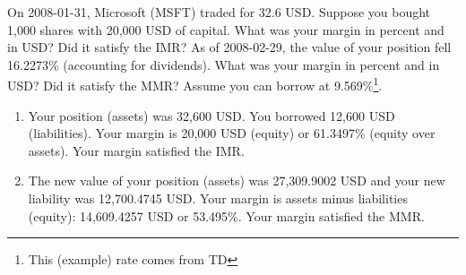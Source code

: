 \documentclass{beamer}
\begin{document}

\begin{frame}{}
	\small
	On 2008-01-31, Microsoft (MSFT) traded for 32.6 USD. Suppose you bought 1,000 shares with 20,000 USD of capital. What was your margin in percent and in USD? Did it satisfy the IMR? As of 2008-02-29, the value of your position fell 16.2273\% (accounting for dividends). What was your margin in percent and in USD? Did it satisfy the MMR? Assume you can borrow at 9.569\%\footnote{This (example) rate comes from TD}.  
	\pause
		\begin{enumerate}
			\item{\color{blue}Your position (assets) was 32,600 USD. You borrowed 12,600 USD (liabilities). Your margin is 20,000 USD (equity) or 61.3497\% (equity over assets). Your margin satisfied the IMR.}
			\item{\color{blue}The new value of your position (assets) was 27,309.9002 USD and your new liability was 12,700.4745 USD. Your margin is assets minus liabilities (equity): 14,609.4257 USD or 53.495\%. Your margin satisfied the MMR.}
		\end{enumerate}
\end{frame}
\end{document}
